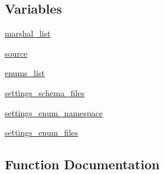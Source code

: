 \subsection*{Variables}
\begin{DoxyCompactItemize}
\item 
\hyperlink{namespacewaflib_1_1_tools_1_1glib2_ae08b829c279f119cd3e4def700f1ebe2}{marshal\+\_\+list}
\item 
\hyperlink{namespacewaflib_1_1_tools_1_1glib2_aed296e0a65eb90e6dbf195a192acc9a2}{source}
\item 
\hyperlink{namespacewaflib_1_1_tools_1_1glib2_af080f2e4a94c9c60680d4851c52ce608}{enums\+\_\+list}
\item 
\hyperlink{namespacewaflib_1_1_tools_1_1glib2_aec9fd9d9f89530be04d17e74e40f083b}{settings\+\_\+schema\+\_\+files}
\item 
\hyperlink{namespacewaflib_1_1_tools_1_1glib2_aadec49bc7d0bcff250cdbcc9ccafcf5d}{settings\+\_\+enum\+\_\+namespace}
\item 
\hyperlink{namespacewaflib_1_1_tools_1_1glib2_aa8b977a232bdfb079752a90d72c8b41d}{settings\+\_\+enum\+\_\+files}
\end{DoxyCompactItemize}


\subsection{Function Documentation}
